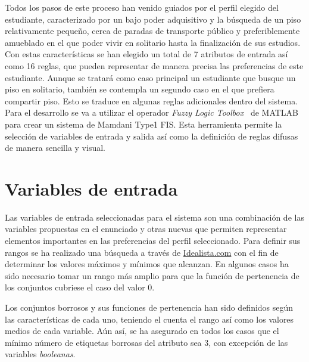\documentclass[12pt]{report} %
\begin{document}
        Todos los pasos de este proceso han venido guiados por el perfil
        elegido del estudiante, caracterizado por un bajo poder adquisitivo y
        la búsqueda de un piso relativamente pequeño, cerca de paradas de
        transporte público y preferiblemente amueblado en el que poder vivir en
        solitario hasta la finalización de sus estudios. Con estas
        características se han elegido un total de 7 atributos de entrada así
        como 16 reglas, que pueden representar de manera precisa las
        preferencias de este estudiante. Aunque se tratará como caso principal
        un estudiante que busque un piso en solitario, también se contempla un
        segundo caso en el que prefiera compartir piso. Esto se traduce en
        algunas reglas adicionales dentro del sistema. Para el desarrollo se va
        a utilizar el operador \textit{Fuzzy Logic Toolbox}~\cite{fuzzy-docs}
        de MATLAB para crear un sistema de Mamdani Type1 FIS. Esta herramienta
        permite la selección de variables de entrada y salida así como la
        definición de reglas difusas de manera sencilla y visual.

    \section{Variables de entrada}

        Las variables de entrada seleccionadas para el sistema son una
        combinación de las variables propuestas en el enunciado y otras nuevas
        que permiten representar elementos importantes en las preferencias del
        perfil seleccionado. Para definir sus rangos se ha realizado una
        búsqueda a través de \href{https://www.idealista.com/}{Idealista.com}
        con el fin de determinar los valores máximos y mínimos que alcanzan. En
        algunos casos ha sido necesario tomar un rango más amplio para que la
        función de pertenencia de los conjuntos cubriese el caso del valor 0.

        Los conjuntos borrosos y sus funciones de pertenencia han sido
        definidos según las características de cada uno, teniendo el cuenta el
        rango así como los valores medios de cada variable. Aún así, se ha
        asegurado en todos los casos que el mínimo número de etiquetas borrosas del
        atributo sea 3, con excepción de las variables \textit{booleanas}.
\end{document}
